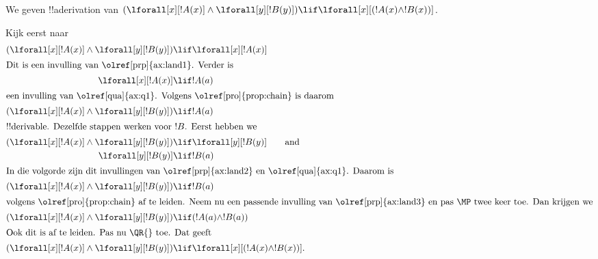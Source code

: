 \documentclass[openany]{memoir}
\begin{document}
\begingroup
\def\olfilename{OLP-0117}
\def\olfilepath{content/first-order-logic/axiomatic-deduction/}
\hypertarget{unit-OLP-0117}{}





\begin{ex}
We geven !!a{derivation} van $(\lforall[x][!A(x)] \land
\lforall[y][!B(y)]) \lif \lforall[x][(!A(x) \land !B(x))]$.

Kijk eerst naar
\begin{align*}
  (\lforall[x][!A(x)] \land \lforall[y][!B(y)]) & \lif \lforall[x][!A(x)]\\
  \intertext{Dit is een invulling van \olref[prp]{ax:land1}. Verder is}
  \lforall[x][!A(x)] & \lif !A(a) \\
  \intertext{een invulling van \olref[qua]{ax:q1}. Volgens \olref[pro]{prop:chain} is daarom}
  (\lforall[x][!A(x)] \land \lforall[y][!B(y)]) & \lif !A(a) \\
  \intertext{!!{derivable}. Dezelfde stappen werken voor $!B$. Eerst hebben we}
  (\lforall[x][!A(x)] \land \lforall[y][!B(y)]) & \lif \lforall[y][!B(y)] \qquad\text{and}\\
    \lforall[y][!B(y)] & \lif !B(a)\\
    \intertext{In die volgorde zijn dit invullingen van \olref[prp]{ax:land2} en \olref[qua]{ax:q1}. Daarom is}
    (\lforall[x][!A(x)] \land \lforall[y][!B(y)]) & \lif !B(a)\\
    \intertext{volgens \olref[pro]{prop:chain} af te leiden. Neem nu een passende invulling van \olref[prp]{ax:land3} en pas~\MP twee keer toe. Dan krijgen we}
    (\lforall[x][!A(x)] \land \lforall[y][!B(y)]) & \lif (!A(a) \land !B(a))\\
    \intertext{Ook dit is af te leiden. Pas nu \QR{} toe. Dat geeft}
(\lforall[x][!A(x)] \land \lforall[y][!B(y)]) & \lif \lforall[x][(!A(x) \land !B(x))].
\end{align*}
\end{ex}
\endgroup
\end{document}
